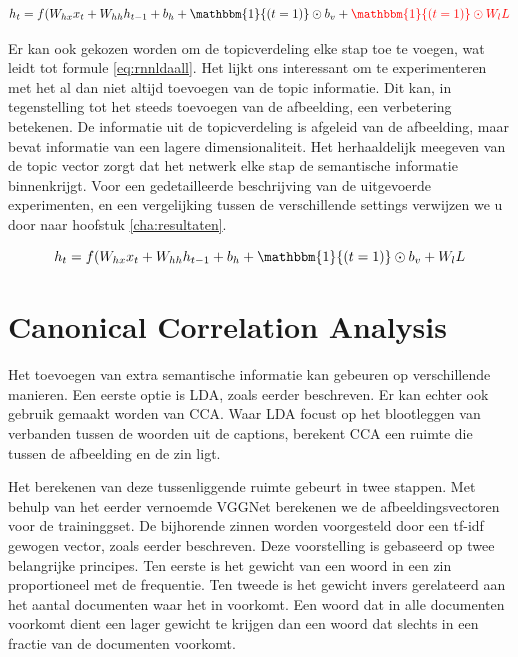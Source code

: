\begin{equation}
    h_t = f(W_{hx} x_{t} + W_{hh} h_{t-1} + b_h + \mathbbm{1}{(t=1)} \odot b_v +\color{red}{\mathbbm{1}{(t=1)} \odot W_lL}
    \color{black}
    \label{eq:rnnldaonce}
\end{equation}

Er kan ook gekozen worden om de topicverdeling elke stap toe te voegen, wat leidt tot formule \eqref{eq:rnnldaall}. Het lijkt ons interessant om te experimenteren met het al dan niet altijd toevoegen van de topic informatie. Dit kan, in tegenstelling tot het steeds toevoegen van de afbeelding, een verbetering betekenen. De informatie uit de topicverdeling is afgeleid van de afbeelding, maar bevat informatie van een lagere dimensionaliteit. Het herhaaldelijk meegeven van de topic vector zorgt dat het netwerk elke stap de semantische informatie binnenkrijgt. Voor een gedetailleerde beschrijving van de uitgevoerde experimenten, en een vergelijking tussen de verschillende settings verwijzen we u door naar hoofstuk \ref{cha:resultaten}.


\begin{equation}
    h_t = f(W_{hx} x_{t} + W_{hh} h_{t-1} + b_h + \mathbbm{1}{(t=1)} \odot b_v + W_lL
    \label{eq:rnnldaall}
\end{equation}



\section{Canonical Correlation Analysis}
Het toevoegen van extra semantische informatie kan gebeuren op verschillende manieren. Een eerste optie is LDA, zoals eerder beschreven. Er kan echter ook gebruik gemaakt worden van CCA. Waar LDA focust op het blootleggen van verbanden tussen de woorden uit de captions, berekent CCA een ruimte die tussen de afbeelding en de zin ligt.

Het berekenen van deze tussenliggende ruimte gebeurt in twee stappen. Met behulp van het eerder vernoemde VGGNet berekenen we de afbeeldingsvectoren voor de traininggset. De bijhorende zinnen worden voorgesteld door een tf-idf gewogen vector, zoals eerder beschreven. Deze voorstelling is gebaseerd op twee belangrijke principes. Ten eerste is het gewicht van een woord in een zin proportioneel met de frequentie. Ten tweede is het gewicht invers gerelateerd aan het aantal documenten waar het in voorkomt. Een woord dat in alle documenten voorkomt dient een lager gewicht te krijgen dan een woord dat slechts in een fractie van de documenten voorkomt.


